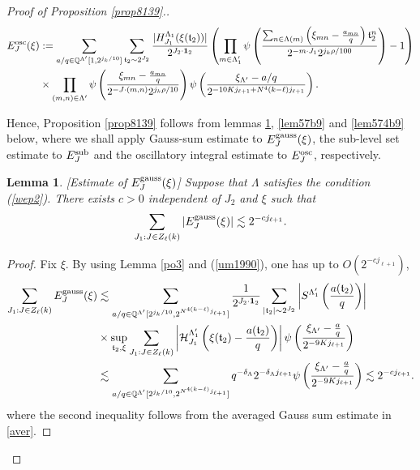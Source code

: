 \documentclass[11 pt,letterpaper]{amsart}
\theoremstyle{plain}
\newtheorem{lemma}{Lemma}\numberwithin{lemma}{section}
\theoremstyle{definition}
\theoremstyle{remark} \theoremstyle{exam} \theoremstyle{ob}
\numberwithin{equation}{section}
\begin{document}
\begin{proof}[Proof of Proposition \ref{prop8139}.]
\begin{align*}
		E^{\rm{osc}}_J(\xi)&:=   \sum_{ a/q\in \mathbb{Q}^{\Lambda'}[1,2^{j_k/10}]}  \sum_{\mathfrak{t}_2\sim  2^{J_2}}    \frac{|H^{\Lambda_{1}}_{J_1}(\xi(\mathfrak{t}_2))|}{2^{J_2\cdot {\bf 1}_2}} \left(  \prod_{m\in\Lambda'_{1}}\psi\left( \frac{\sum_{n\in\Lambda(m)}\left( \xi_{mn}-\frac{a_{mn}}{q} \right)\mathfrak{t}_2^n }{2^{-m\cdot J_1} 2^{ j_k\rho/100}} \right) -1\right)\nonumber\\
	&\times \prod_{(m,n)\in \Lambda'} \psi\left(  \frac{  \xi_{mn}-\frac{a_{mn}}{q}}{ 2^{-J\cdot (m,n)}2^{j_k\rho/10}} \right)\psi\left(\frac{\xi_{\Lambda'}-a/q}{2^{-10Kj_{\ell+1}+N^4(k-\ell)j_{\ell+1} }}\right).
\end{align*}



Hence, Proposition \ref{prop8139} follows from  lemmas \ref{lem859}, \ref{lem57b9} and \ref{lem574b9} below, where we shall apply Gauss-sum estimate to $E^{\rm{gauss}}_J(\xi)$,  the sub-level set estimate to $E^{\rm{sub}}_J$ and the oscillatory integral estimate to $E^{\rm{osc}}_J$,   respectively.



 \begin{lemma}\label{lem859}[Estimate of $E^{\rm{gauss}}_J(\xi)$]
 Suppose that $\Lambda$ satisfies   the  condition (\ref{wep2}). There exists $c>0$ independent of $J_2$ and $\xi$ such that 
$$\sum_{J_1:J\in Z_{\ell}(k)} |E^{\rm{gauss}}_J(\xi)|\lesssim 2^{-cj_{\ell+1}}.$$
\end{lemma}
\begin{proof} 
Fix $\xi$. By using Lemma \ref{po3} and (\ref{um1990}),  one has up to $O(2^{-cj_{\ell+1}})$,
  \begin{align*}
\sum_{J_1:J\in Z_{\ell}(k)} E^{\rm{gauss}}_J(\xi)
&\lesssim \sum_{a/q\in  \mathbb{Q}^{\Lambda'}[2^{j_k/10}, 2^{N^{4(k-\ell)}j_{\ell+1} }] } \frac{1}{2^{J_2\cdot {\bf 1}_2}}\sum_{|\mathfrak{t}_2|\sim 2^{J_2}}\left|S^{\Lambda_{1}'}\left( \frac{a(\mathfrak{t}_2)}{q} \right)\right| \\
 &\times\sup_{\mathfrak{t}_2,\xi} \sum_{J_1:J\in Z_\ell(k)}\left|\mathcal{H}^{\Lambda_{1}'}_{J_1}\left( \xi(\mathfrak{t}_2)-\frac{a(\mathfrak{t}_2)}{q}  \right)\right|\psi\left(\frac{\xi_{\Lambda'}-\frac{a}{q}}{2^{-9Kj_{\ell+1}}}\right)\\
&\lesssim \sum_{a/q\in  \mathbb{Q}^{\Lambda'}[2^{j_k/10},2^{N^{4(k-\ell)}j_{\ell+1}} ]}  q^{-\delta_{\Lambda}}2^{-\delta_{\Lambda}j_{\ell+1}}\psi\left(\frac{\xi_{\Lambda'}-\frac{a}{q}}{2^{-9 Kj_{\ell+1}}}\right)  \lesssim   2^{-cj_{\ell+1}}.
 \end{align*}  
where the second inequality follows from the averaged Gauss sum estimate in \eqref{aver}. 
\end{proof} 





\end{proof}
\end{document}
